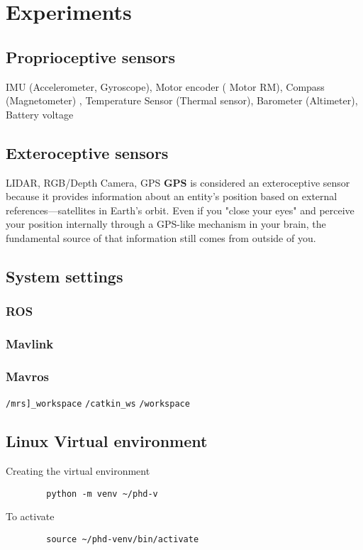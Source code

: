 \chapter{Experiments}



\section{Proprioceptive sensors} IMU (Accelerometer, Gyroscope), Motor encoder (	Motor RM), Compass (Magnetometer) , Temperature Sensor (Thermal sensor), Barometer (Altimeter), Battery voltage

\section{Exteroceptive sensors} LIDAR, RGB/Depth Camera, GPS
    \textbf{GPS} is considered an exteroceptive sensor because it provides information about an entity’s position based on external references—satellites in Earth's orbit. Even if you "close your eyes" and perceive your position internally through a GPS-like mechanism in your brain, the fundamental source of that information still comes from outside of you.


\section{System settings}
    \subsection{ROS}
    \subsection{Mavlink}
    \subsection{Mavros}
        \texttt{/mrs]\_workspace}
        \texttt{/catkin\_ws}
        \texttt{/workspace}

\section{Linux Virtual environment}
    Creating the virtual environment
    \begin{verbatim}
        python -m venv ~/phd-v
    \end{verbatim}
    
    To activate
    \begin{verbatim}
        source ~/phd-venv/bin/activate
    \end{verbatim}
    
